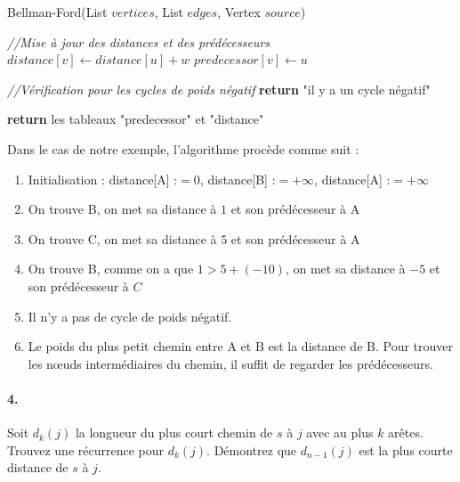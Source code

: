 \begin{solution}
\begin{algorithm}{Bellman-Ford(List $vertices$, List $edges$, Vertex $source$)}
\begin{algorithmic}
				\medskip
				\STATE \textit{//Mise à jour des distances et des prédécesseurs}		
							\STATE $distance[v] \leftarrow distance[u] + w$
							\STATE $predecessor[v] \leftarrow u$
						\ENDIF
					\ENDFOR			
				\ENDFOR
				
				\medskip
				\STATE \textit{//Vérification pour les cycles de poids négatif}
						\STATE \textbf{return} "il y a un cycle négatif"
					\ENDIF
				\ENDFOR
				\medskip
				
				\STATE \textbf{return} les tableaux "predecessor" et "distance"
			\end{algorithmic}
		\end{algorithm}	
		
		Dans le cas de notre exemple, l'algorithme procède comme suit :
		\begin{enumerate}
			\item Initialisation : distance[A] :$= 0$, distance[B] :$= +\infty$, distance[A] :$= +\infty$
			\item On trouve B, on met sa distance à $1$ et son prédécesseur à A
			\item On trouve C, on met sa distance à $5$ et son prédécesseur à A
			\item On trouve B, comme on a que $1>5+(-10)$, on met sa distance à $-5$ et son prédécesseur à $C$
			\item Il n'y a pas de cycle de poids négatif.
			\item Le poids du plus petit chemin entre A et B est la distance de B. Pour trouver les nœuds intermédiaires du chemin, il suffit de regarder les prédécesseurs.
		\end{enumerate}
\end{solution}

\paragraph{4. } Soit $d_k(j)$ la longueur du plus court chemin de $s$ à $j$ avec au plus $k$ arêtes. Trouvez une récurrence pour $d_k(j)$. Démontrez que $d_{n-1}(j)$ est la plus courte distance de $s$ à $j$.

